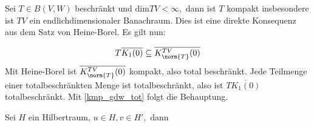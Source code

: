 \begin{ex}\label{finite_rank_compakt} Sei $T \in B(V, W)$ beschränkt und $\text{dim}{TV} < \infty,$ dann ist $T$ kompakt insbesondere ist $TV$ ein endlichdimensionaler Banachraum. Dies ist eine direkte Konsequenz aus dem Satz von Heine-Borel. Es gilt nun:
	
	
	\[T\overline{K_1(0)} \subseteq \overline{K^{TV}_{\norm{T}}(0)}\]
	Mit Heine-Borel ist $\overline{K^{TV}_{\norm{T}}(0)}$ kompakt, also total beschränkt.  Jede Teilmenge einer totalbeschränkten Menge ist totalbeschränkt, also ist $T\overline{K_1(0)}$ totalbeschränkt. Mit \ref{kmp_gdw_tot} folgt die Behauptung.
	
\end{ex}


\begin{ex} Sei $H$ ein Hilbertraum, $u \in H, v \in H',$ dann 
	
\end{ex}


